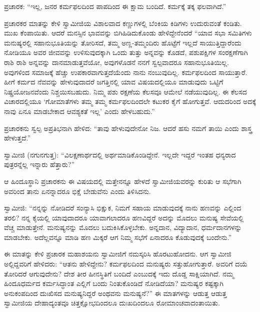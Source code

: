  ಪ್ರಚಾರಕ: “ಇಲ್ಲ, ಜನರ ಕರ್ಮಫಲದಿಂದ ಪಾಪದಿಂದ ಈ ಕ್ಷಾಮ ಬಂದಿದೆ. ಕರ್ಮಕ್ಕೆ ತಕ್ಕ ಫಲವಾಗಿದೆ.” 

 ಪ್ರಚಾರಕರ ಮಾತನ್ನು ಕೇಳಿ ಸ್ವಾಮೀಜಿಯ ವಿಶಾಲವಾದ ಕಣ್ಣುಗಳಲ್ಲಿ ಬೆಂಕಿಯ ಕಿಡಿಗಳು ಉದುರುವಂತೆ ಕಂಡಿತು. ಮುಖ ಕೆಂಪಾಯಿತು. ಆದರೆ ಮನಸ್ಸಿನ ಭಾವವನ್ನು ಬಿಗಿಹಿಡಿದುಕೊಂಡು ಹೇಳಿದ್ದೇನೆಂದರೆ “ಯಾವ ಸಭಾ ಸಮಿತಿಗಳು ಮನುಷ್ಯರಲ್ಲಿ ಸಹಾನುಭೂತಿಯನ್ನು ತೋರಿಸದೆ, ತಮ್ಮ ಅಣ್ಣ-ತಮ್ಮಂದಿರು ಹೊಟ್ಟೆಗೆ ಇಲ್ಲದೆ ಸಾಯುತ್ತಿದ್ದಾರೆಂದು ನೋಡಿಯೂ ಅವರ ಜೀವವನ್ನು ಉಳಿಸುವುದಕ್ಕಾಗಿ ಒಂದು ತುತ್ತು ಅನ್ನವನ್ನು ಕೊಡದೆ, ಪಶುಪಕ್ಷಿಗಳ ಸಂರಕ್ಷಣೆಗಾಗಿ ರಾಶಿ ರಾಶಿ ಅನ್ನವನ್ನು ದಾನಮಾಡುತ್ತವೆಯೋ, ಅವುಗಳೊಡನೆ ನನಗೆ ಸ್ವಲ್ಪವಾದರೂ ಸಹಾನುಭೂತಿಯಿಲ್ಲ. ಅವುಗಳಿಂದ ಸಮಾಜಕ್ಕೆ ಹೆಚ್ಚು ಉಪಕಾರವಾಗುತ್ತದೆಯೆಂದು ನಾನು ನಂಬುವುದಿಲ್ಲ. ಕರ್ಮಫಲದಿಂದ ಸಾಯುತ್ತಾರೆ. ಹೀಗೆ ಕರ್ಮದ ನೆವವನ್ನು ಹೇಳುವುದಾದರೆ ಜಗತ್ತಿನಲ್ಲಿ ಯಾವ ವಿಷಯದಲ್ಲಿಯೂ ಮಾಡುವುದು ಒಟ್ಟಿಗೆ ನಿಷ್ಪ್ರಯೋಜನವೆಂದು ನಿಶ್ಚಯಿಸಬಹುದು. ನಿಮ್ಮ ಪಶು ರಕ್ಷಣೆಯ ಕೆಲಸವೂ ಆಮೇಲೆ ನಡೆಯುವುದಿಲ್ಲ. ಈ ಕೆಲಸದ ವಿಚಾರದಲ್ಲಿಯೂ ‘ಗೋಮಾತೆಗಳು ತಮ್ಮ ತಮ್ಮ ಕರ್ಮಫಲದಿಂದಲೇ ಕಟುಕರ ಕೈಗೆ ಹೋಗುತ್ತವೆ. ಆದುದರಿಂದ ಅದಕ್ಕೆ ನಾವು ಏನೂ ಮಾಡಬೇಕಾದ ಆವಶ್ಯಕತೆ ಇಲ್ಲ’ ಎಂದು ಹೇಳಬಹುದು.” 

 ಪ್ರಚಾರಕನು ಸ್ವಲ್ಪ ಅಪ್ರತಿಭನಾಗಿ ಹೇಳಿದ: “ತಾವು ಹೇಳುವುದೇನೋ ನಿಜ. ಆದರೆ ಹಸು ನಮಗೆ ತಾಯಿ ಎಂದು ಶಾಸ್ತ್ರ ಹೇಳುತ್ತದೆ.” 

 ಸ್ವಾಮೀಜಿ (ನಗುನಗುತ್ತ): “ವಿಲಕ್ಷಣಾರ್ಥದಲ್ಲಿ ಅರ್ಥಮಾಡಿಕೊಂಡಿದ್ದೇನೆ. ಇಲ್ಲದೇ ಇದ್ದರೆ ಇಂತಹ ಧನ್ಯರಾದ ಪುತ್ರರನ್ನೆಲ್ಲ ಇನ್ನಾರು ಹೆತ್ತಾರು?” 

 ಆ ಹಿಂದೂಸ್ಥಾನಿ ಪ್ರಚಾರಕನು ಈ ವಿಷಯದಲ್ಲಿ ಮತ್ತೇನನ್ನೂ ಹೇಳದೆ ಸ್ವಾಮೀಜಿಯವರನ್ನು ಕುರಿತು ಆ ಸಭೆಗಾಗಿ ಅವರಿಂದ ತಾನು ಏನನ್ನಾದರೂ ಭಿಕ್ಷೆ ಬೇಡುವೆನು ಎಂದು ತಿಳಿಸಿದನು. 

 ಸ್ವಾಮೀಜಿ: “ನನ್ನನ್ನು ನೋಡಿದರೆ ಸಂನ್ಯಾಸಿ ಭಿಕ್ಷುಕ, ನಿಮಗೆ ಸಹಾಯ ಮಾಡುವುದಕ್ಕೆ ನಾನು ಹಣವನ್ನು ಎಲ್ಲಿಂದ ತರಲಿ? ನನ್ನ ಕೈಯಲ್ಲಿ ಯಾವುದಾದರೂ ಯಾವಾಗಲಾದರೂ ಹಣವಿದ್ದರೆ ಅದನ್ನು ಮೊದಲು ಮನುಷ್ಯ ಸೇವೆಯಲ್ಲಿ ವೆಚ್ಚ ಮಾಡುತ್ತೇನೆ. ಮನುಷ್ಯನನ್ನು ಮೊದಲು ಬದುಕಿಸಿಕೊಳ್ಳಬೇಕು. ಅನ್ನದಾನ, ವಿದ್ಯಾದಾನ, ಧರ್ಮದಾನಗಳನ್ನು ಮಾಡಬೇಕು. ಅದೆಲ್ಲವನ್ನೂ ಮಾಡಿ ಹಣ ಮಿಕ್ಕರೆ ಆಗ ನಿಮ್ಮ ಸಭೆಗೆ ಏನಾದರೂ ಕೊಡುವುದಕ್ಕೆ ಬಂದೇನು.” 

 ಈ ಮಾತನ್ನು ಕೇಳಿ ಪ್ರಚಾರಕ ಮಹಾಶಯನು ಸ್ವಾಮೀಜಿಗೆ ನಮಸ್ಕರಿಸಿ ಹೊರಟುಹೋದನು. ಆಗ ಸ್ವಾಮೀಜಿ ಅಲ್ಲಿದ್ದವರಿಗೆ ಹೇಳಿದರು: “ಆತನು ಹೇಳಿದ್ದೇನು? ಕರ್ಮಫಲದಿಂದ ಮನುಷ್ಯರು ಸತ್ತುಹೋಗುತ್ತಾರೆ. ಅವರಿಗೆ ದಯೆ ತೋರಿದರೆ ಆಗುವುದೇನು? ದೇಶ ತೀರ ಹೀನಸ್ಥಿತಿಗೆ ಬಂದಿದೆ ಎಂಬುದಕ್ಕೆ ಇದು ದೊಡ್ಡ ಸಾಕ್ಷಿಯಾಗಿದೆ. ನಮ್ಮ ಹಿಂದೂಧರ್ಮದ ಕರ್ಮಸಿದ್ಧಾಂತ ಎಲ್ಲಿಗೆ ಬಂದು ನಿಂತುಕೊಂಡಿದೆ ನೋಡಿದೆಯಾ? ಮನುಷ್ಯರ ಕಷ್ಟಕ್ಕಾಗಿ ಅನುಕಂಪದಿಂದ ದುಃಖಿಸದ ಮನುಷ್ಯನಿದ್ದರೆ ಅಂಥವನು ಮನುಷ್ಯನೆ?” ಈ ಮಾತಗಳನ್ನು ಆಡುತ್ತ ಆಡುತ್ತ ಸ್ವಾಮೀಜಿಯ ದೇಹಾದ್ಯಂತವೂ ಚಿತ್ತಕ್ಷೋಭದಿಂದಲೂ ದುಃಖದಿಂದಲೂ ರೋಮಾಂಚವಾದಂತಾಯಿತು. 

